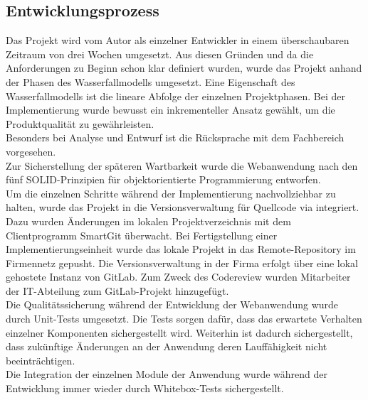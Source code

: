 \subsection{Entwicklungsprozess}
\label{sec:Entwicklungsprozess}
Das Projekt wird vom Autor als einzelner Entwickler in einem überschaubaren Zeitraum 
von drei Wochen umgesetzt. Aus diesen Gründen und da die Anforderungen zu Beginn schon
klar definiert wurden, wurde das Projekt anhand der Phasen des Wasserfallmodells umgesetzt. 
Eine Eigenschaft des Wasserfallmodells ist die lineare Abfolge der einzelnen Projektphasen.
Bei der Implementierung wurde bewusst ein inkrementeller Ansatz gewählt, um die Produktqualität
zu gewährleisten.\\
Besonders bei Analyse und Entwurf ist die Rücksprache mit dem Fachbereich
vorgesehen.\\
Zur Sicherstellung der späteren Wartbarkeit wurde die Webanwendung nach den fünf SOLID-Prinzipien
für objektorientierte Programmierung entworfen.\\ 
Um die einzelnen Schritte während der Implementierung nachvollziehbar zu halten,
wurde das Projekt in die Versionsverwaltung für Quellcode via  integriert.
Dazu wurden Änderungen im lokalen Projektverzeichnis mit dem Clientprogramm SmartGit überwacht.
Bei Fertigstellung einer Implementierungseinheit wurde das lokale Projekt in das 
Remote-Repository im Firmennetz gepusht. Die Versionsverwaltung in der Firma erfolgt über eine lokal gehostete Instanz
von GitLab. Zum Zweck des Codereview wurden Mitarbeiter der IT-Abteilung zum GitLab-Projekt hinzugefügt.\\
Die Qualitätssicherung während der Entwicklung der Webanwendung wurde durch Unit-Tests umgesetzt. Die Tests 
sorgen dafür, dass das erwartete Verhalten einzelner Komponenten sichergestellt wird. Weiterhin ist dadurch 
sichergestellt, dass zukünftige Änderungen an der Anwendung deren Lauffähigkeit nicht beeinträchtigen.\\
Die Integration der einzelnen Module der Anwendung wurde während der Entwicklung immer wieder durch Whitebox-Tests
sichergestellt.
\clearpage